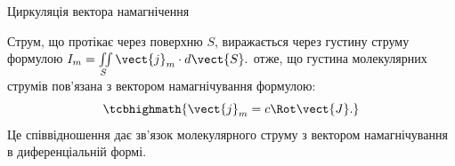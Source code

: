 \documentclass[onlytextwidth]{beamer}
\begin{document}
\begin{frame}{Циркуляція вектора намагнічення}{}
\begin{onlyenv}
		\begin{block}{}\justifying
			Струм, що протікає через поверхню $S$, виражається через густину струму формулою
			\(
			I_m = \iint\limits_S \vect{j}_m\cdot d\vect{S}.
			\)
			отже, що густина молекулярних струмів пов'язана з вектором намагнічування
			формулою:
			\begin{equation*}
				\tcbhighmath{\vect{j}_m = c\Rot\vect{J}.}
			\end{equation*}
			Це співвідношення дає \alert{зв'язок молекулярного струму з вектором намагнічування в диференціальній формі}.
		\end{block}
	\end{onlyenv}
\end{frame}
\end{document}
